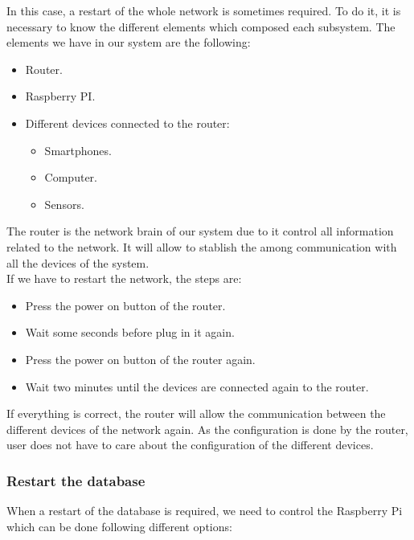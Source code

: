 In this case, a restart of the whole network is sometimes required. To do it, it is necessary to know the different elements which composed each subsystem. The elements we have in our system are the following:

\begin{itemize}
\item Router.
\item Raspberry PI.
\item Different devices connected to the router:
\begin{itemize}
\item Smartphones.
\item Computer.
\item Sensors.
\end{itemize}	
\end{itemize}

The router is the network brain of our system due to it control all information related to the network. It will allow to stablish the among communication with all the devices of the system.\\

If we have to restart the network, the steps are:

\begin{itemize}
\item Press the power on button of the router.
\item Wait some seconds before plug in it again.
\item Press the power on button of the router again.
\item Wait two minutes until the devices are connected again to the router.
\end{itemize}

If everything is correct, the router will allow the communication between the different devices of the network again. As the configuration is done by the router, user does not have to care about the configuration of the different devices.\\

\subsubsection{Restart the database}

When a restart of the database is required, we need to control the Raspberry Pi which can be done following different options:

